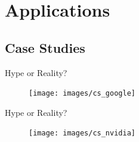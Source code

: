 \documentclass[10pt]{beamer}
\begin{document}
	\section{Applications}
	\subsection{Case Studies}
	\begin{frame}[c]{Hype or Reality?}
		\pause
		\begin{figure}
			\texttt{[image: images/cs\_google]}
		\end{figure}
	\end{frame}
	\begin{frame}{Hype or Reality?}
		\begin{figure}
			\texttt{[image: images/cs\_nvidia]}
		\end{figure}
	\end{frame}
\end{document}

